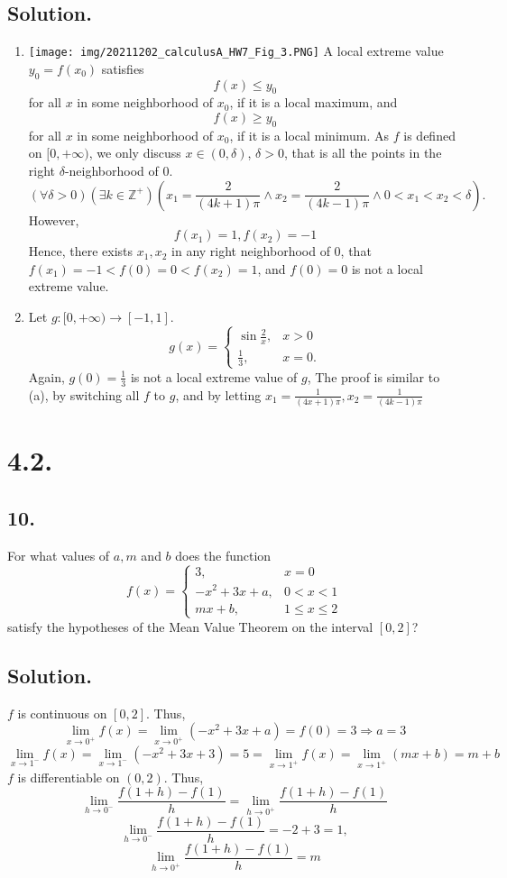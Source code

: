 \documentclass{article}
\begin{document}
\subsection*{Solution.}
\begin{enumerate} [label=\textbf{\alph*.}]
    \item \textbf{ }\newline
    \texttt{[image: img/20211202\_calculusA\_HW7\_Fig\_3.PNG]}
    \newline
    A local extreme value $y_0=f(x_0)$ satisfies
    \[f(x)\leq y_0\]
    for all $x$ in some neighborhood of $x_0$, if it is a local maximum,
    and 
    \[f(x)\geq y_0\]
    for all $x$ in some neighborhood of $x_0$, if it is a local minimum.\newline
    As $f$ is defined on $[0,+\infty)$, we only discuss $x\in(0,\delta)$, $\delta>0$, that is all the points in the right $\delta$-neighborhood of 0.
    \[(\forall \delta>0)(\exists k\in \mathbb{Z}^+)(x_1=\frac{2}{(4k+1)\pi}\land x_2=\frac{2}{(4k-1)\pi}\land 0<x_1<x_2<\delta).\]
    However,
    \[f(x_1)=1,f(x_2)=-1\]
    Hence, there exists $x_1,x_2$ in any right neighborhood of 0, that $f(x_1)=-1<f(0)=0<f(x_2)=1$, and $f(0)=0$ is not a local extreme value.
    \item Let $g:[0,+\infty)\to [-1,1]$.
    \[g(x)=\left\{\begin{array}{ll}
    \sin\frac{2}{x}, & x>0 \\
    \frac{1}{3}, & x=0.
    \end{array}\right.\]
    Again, $g(0)=\frac{1}{3}$ is not a local extreme value of $g$, The proof is similar to (a), by switching all $f$ to $g$, and by letting $x_1=\frac{1}{(4x+1)\pi},x_2=\frac{1}{(4k-1)\pi}$ 
\end{enumerate}
\section*{4.2.}
\subsection*{10.}
For what values of $a,m$ and $b$ does the function 
\[f(x)=\left\{\begin{array}{ll}
3, & x=0 \\
-x^2+3x+a, & 0<x<1 \\
mx+b, & 1\leq x\leq 2
\end{array}\right.\]
satisfy the hypotheses of the Mean Value Theorem on the interval $[0,2]$?
\subsection*{Solution.}
$f$ is continuous on $[0,2]$. Thus,
\[\lim_{x\to 0^+}f(x)=\lim_{x\to 0^+} (-x^2+3x+a)=f(0)=3\Rightarrow a=3\]
\[\lim_{x\to 1^-}f(x)=\lim_{x\to 1^-}(-x^2+3x+3)=5=\lim _{x\to 1^+} f(x)=\lim _{x\to 1^+} (mx+b) =m+b\]
$f$ is differentiable on $(0,2)$. Thus,
\[\lim _{h\to 0^-}\frac{f(1+h)-f(1)}{h}=\lim _{h\to 0^+}\frac{f(1+h)-f(1)}{h}\]
\[\lim _{h\to 0^-}\frac{f(1+h)-f(1)}{h}=-2+3=1,\]
\[\lim _{h\to 0^+} \frac{f(1+h)-f(1)}{h}=m\]
\end{document}
